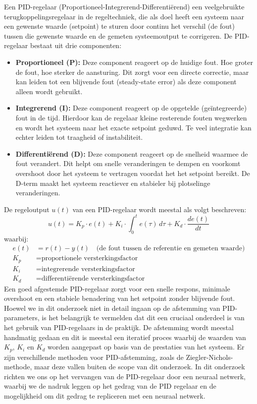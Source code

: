 Een PID-regelaar (Proportioneel-Integrerend-Differentiërend)\cite{WikipediaPID2025} een veelgebruikte terugkoppelingsregelaar in de regeltechniek, die als doel heeft een systeem naar een gewenste waarde (setpoint) te sturen door continu het verschil (de fout) tussen die gewenste waarde en de gemeten systeemoutput te corrigeren.
De PID-regelaar bestaat uit drie componenten:
\begin{itemize}
  \item \textbf{Proportioneel (P):} Deze component reageert op de huidige fout. Hoe groter de fout, hoe sterker de aansturing. Dit zorgt voor een directe correctie, maar kan leiden tot een blijvende fout (steady-state error) als deze component alleen wordt gebruikt.
  \item \textbf{Integrerend (I):} Deze component reageert op de opgetelde (geïntegreerde) fout in de tijd. Hierdoor kan de regelaar kleine resterende fouten wegwerken en wordt het systeem naar het exacte setpoint geduwd. Te veel integratie kan echter leiden tot traagheid of instabiliteit.
  \item \textbf{Differentiërend (D):} Deze component reageert op de snelheid waarmee de fout verandert. Dit helpt om snelle veranderingen te dempen en voorkomt overshoot door het systeem te vertragen voordat het het setpoint bereikt. De D-term maakt het systeem reactiever en stabieler bij plotselinge veranderingen.
\end{itemize}
De regeloutput \( u(t) \) van een PID-regelaar wordt meestal als volgt beschreven:
\begin{equation}
u(t) = K_p \cdot e(t) + K_i \cdot \int_0^t e(\tau)\,d\tau + K_d \cdot \frac{de(t)}{dt}
\label{eq:pid}
\end{equation}
waarbij:
\[
\begin{aligned}
e(t) &= r(t) - y(t) \quad \text{(de fout tussen de referentie en gemeten waarde)} \\
K_p  &= \text{proportionele versterkingsfactor} \\
K_i  &= \text{integrerende versterkingsfactor} \\
K_d  &= \text{differentiërende versterkingsfactor}
\end{aligned}
\]
Een goed afgestemde PID-regelaar zorgt voor een snelle respons, minimale overshoot en een stabiele benadering van het setpoint zonder blijvende fout. Hoewel we in dit onderzoek niet in detail ingaan op de afstemming van PID-parameters, is het belangrijk te vermelden dat dit een cruciaal onderdeel is van het gebruik van PID-regelaars in de praktijk. De afstemming wordt meestal handmatig gedaan en dit is meestal een iteratief proces waarbij de waarden van \(K_p\), \(K_i\) en \(K_d\) worden aangepast op basis van de prestaties van het systeem. Er zijn verschillende methoden voor PID-afstemming, zoals de Ziegler-Nichols-methode, maar deze vallen buiten de scope van dit onderzoek. In dit onderzoek richten we ons op het vervangen van de PID-regelaar door een neuraal netwerk, waarbij we de nadruk leggen op het gedrag van de PID regelaar en de mogelijkheid om dit gedrag te repliceren met een neuraal netwerk.
